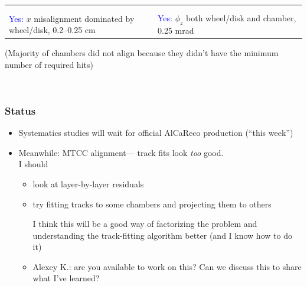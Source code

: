 \documentclass[compress]{beamer}
\begin{document}
\begin{frame}
\begin{center}
\begin{tabular}{p{0.5\linewidth} p{0.5\linewidth}}
\begin{minipage}{\linewidth}
\end{minipage} \\
 & \\
\begin{minipage}{\linewidth}
\textcolor{blue}{Yes:} $x$ misalignment dominated by wheel/disk, 0.2--0.25 cm
\end{minipage} &
\begin{minipage}{\linewidth}
\textcolor{blue}{Yes:} $\phi_z$ both wheel/disk and chamber, 0.25 mrad
\end{minipage}
\end{tabular}
\end{center}

\vfill \vfill (Majority of chambers did not align because they didn't have the
minimum number of required hits)

\vfill \mbox{ }
\end{frame}

\begin{frame}
\frametitle{Status}

\begin{itemize}\setlength{\itemsep}{0.5 cm}
\item Systematics studies will wait for official AlCaReco production (``this week'')

\item Meanwhile: MTCC alignment--- track fits look {\it too} good.  \\
I should

\begin{itemize}\setlength{\itemsep}{0.25 cm}
  \item look at layer-by-layer residuals

  \item try fitting tracks to some chambers and projecting them to
  others

  \vspace{0.25 cm}
  I think this will be a good way of factorizing the problem
  and understanding the track-fitting algorithm better (and I know how
  to do it)

  \item Alexey K.: are you available to work on this?  Can we discuss
  this to share what I've learned?

\end{itemize}
\end{itemize}

\label{numpages}
\end{frame}
\end{document}
